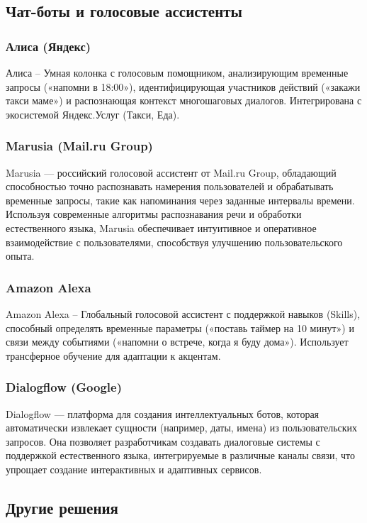 \subsection{Чат-боты и голосовые ассистенты}

\subsubsection{Алиса (Яндекс)}
Алиса \cite{lib:alice}  -- Умная колонка с голосовым помощником, анализирующим временные запросы («напомни в 18:00»), идентифицирующая участников действий («закажи такси маме») и распознающая контекст многошаговых диалогов. Интегрирована с экосистемой Яндекс.Услуг (Такси, Еда).

\subsubsection{Marusia (Mail.ru Group)}
Marusia \cite{lib:marusia}  — российский голосовой ассистент от Mail.ru Group, обладающий способностью точно распознавать намерения пользователей и обрабатывать временные запросы, такие как напоминания через заданные интервалы времени. Используя современные алгоритмы распознавания речи и обработки естественного языка, Marusia обеспечивает интуитивное и оперативное взаимодействие с пользователями, способствуя улучшению пользовательского опыта.

\subsubsection{Amazon Alexa}
Amazon Alexa \cite{lib:alexa} -- Глобальный голосовой ассистент с поддержкой навыков (Skills), способный определять временные параметры («поставь таймер на 10 минут») и связи между событиями («напомни о встрече, когда я буду дома»). Использует трансферное обучение для адаптации к акцентам.

\subsubsection{Dialogflow (Google)}
Dialogflow \cite{lib:Dialogflow} — платформа для создания интеллектуальных ботов, которая автоматически извлекает сущности (например, даты, имена) из пользовательских запросов. Она позволяет разработчикам создавать диалоговые системы с поддержкой естественного языка, интегрируемые в различные каналы связи, что упрощает создание интерактивных и адаптивных сервисов.

\subsection{Другие решения}

